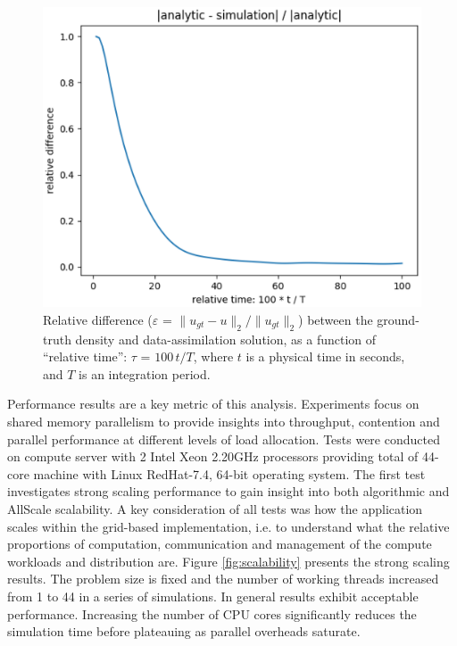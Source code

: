 \documentclass[conference,compsoc]{IEEEtran}
\begin{document}
\begin{figure}
\includegraphics[scale=0.5]{images/rel-diff-Nx304-Ny240}
\caption{Relative difference ($\varepsilon$ = $\|u_{gt} - u\|_2 / \|u_{gt}\|_2$) between the ground-truth density and data-assimilation solution, as a function of ``relative time'': $\tau$ = $100\,t / T$, where $t$ is a physical time in seconds, and $T$ is an integration period.}
\label{fig:relerr}
\end{figure}

 Performance results are a key metric of this analysis. Experiments focus on shared memory parallelism to provide insights into throughput, contention and parallel performance at different levels of load allocation. Tests were conducted on compute server with 2 Intel Xeon 2.20GHz processors providing total of 44-core machine with Linux RedHat-7.4, 64-bit operating system.  The first test investigates strong scaling performance to gain insight into both algorithmic and AllScale scalability. A key consideration of all tests was how the application scales within the grid-based implementation, i.e. to understand what the relative proportions of computation, communication and management of the compute workloads and distribution are. Figure \ref{fig:scalability} presents the strong scaling results. The problem size is fixed and the number of working threads increased from 1 to 44 in a series of simulations.  In general results exhibit acceptable performance. Increasing the number of CPU cores significantly reduces the simulation time before plateauing as parallel overheads saturate.  
\end{document}
